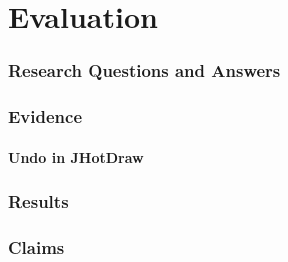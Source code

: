 \chapter{Evaluation}\label{Evaluation}

\subsection{Research Questions and Answers}\label{Research Questions and Answers}

\subsection{Evidence}\label{Evidence}

\subsubsection{Undo in JHotDraw}\label{Undo in JHotDraw}

\subsection{Results}\label{Results}

\subsection{Claims}\label{Claims}